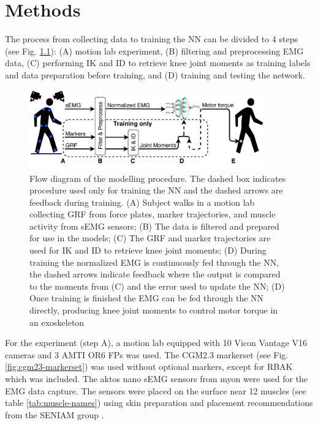 \documentclass[../main.tex]{subfiles}
\begin{document}
\chapter{Methods}
The process from collecting data to training the \ac{NN} can be divided to 4 steps (see Fig. \ref{fig:process-diagram}): (A) motion lab experiment, (B) filtering and preprocessing EMG data, (C) performing \ac{IK} and \ac{ID} to retrieve knee joint moments as training labels and data preparation before training, and (D) training and testing the network.

\begin{figure}[ht]
    \centering
    \includegraphics[width=0.9\textwidth]{img/ProcessDiagram}
    \caption{Flow diagram of the modelling procedure. The dashed box indicates procedure used only for training the \ac{NN} and the dashed arrows are feedback during training. (A) Subject walks in a motion lab collecting \ac{GRF} from force plates, marker trajectories, and muscle activity from \ac{sEMG} sensors; (B) The data is filtered and prepared for use in the models; (C) The \ac{GRF} and marker trajectories are used for \ac{IK} and \ac{ID} to retrieve knee joint moments; (D) During training the normalized \ac{EMG} is continuously fed through the \ac{NN}, the dashed arrows indicate feedback where the output is compared to the moments from (C) and the error used to update the \ac{NN}; (D) Once training is finished the \ac{EMG} can be fed through the \ac{NN} directly, producing knee joint moments to control motor torque in an exoskeleton}
    \label{fig:process-diagram}
\end{figure}

For the experiment (step A), a motion lab equipped with 10 Vicon Vantage V16 cameras and 3 AMTI OR6 \acp{FP} was used. 
The CGM2.3 markerset \textcite{Leboeuf2019} (see Fig. \ref{fig:cgm23-markerset}) was used without optional markers, except for RBAK which was included.
The aktos nano \ac{sEMG} sensors from myon were used for the \ac{EMG} data capture. 
The sensors were placed on the surface near 12 muscles (see table \ref{tab:muscle-names}) using skin preparation and placement recommendations from the SENIAM group \cite{Hermens1999, Hermens2000}.
\end{document}
